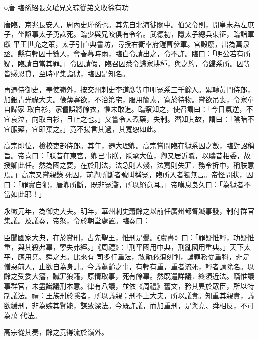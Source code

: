 
\begin{pinyinscope}

 ○唐
 臨孫紹張文瓘兄文琮從弟文收徐有功



 唐臨，京兆長安人，周內史瑾孫也。其先自北海徙關中。伯父令則，開皇末為左庶子，坐諂事太子勇誅死。臨少與兄皎俱有令名。武德初，隱太子總兵東征，臨詣軍獻
 平王世充之策，太子引直典書坊，尋授右衛率府鎧曹參軍。宮殿廢，出為萬泉丞。縣有輕囚十數人，會春暮時雨，臨白令請出之，令不許。臨曰：「明公若有所疑，臨請自當其罪。」令因請假，臨召囚悉令歸家耕種，與之約，令歸系所。囚等皆感恩貸，至時畢集詣獄，臨因是知名。



 再遷侍御史，奉使嶺外，按交州刺史李道彥等申叩冤系三千餘人。累轉黃門侍郎，加銀青光祿大夫。儉薄寡欲，不治第宅，服用簡素，寬於待物。嘗欲吊喪，令家童自歸家
 取白衫，家僮誤將餘衣，懼未敢進。臨察知之，使召謂曰：「今日氣逆，不宜哀泣，向取白衫，且止之也。」又嘗令人煮藥，失制。潛知其故，謂曰：「陰暗不宜服藥，宜即棄之。」竟不揚言其過，其寬恕如此。



 高宗即位，檢校吏部侍郎。其年，遷大理卿。高宗嘗問臨在獄系囚之數，臨對詔稱旨。帝喜曰：「朕昔在東宮，卿已事朕，朕承大位，卿又居近職，以疇昔相委，故授卿此任。然為國之要，在於刑法，法急則人殘，法寬則失罪，務令折中，稱朕意焉。」高宗又嘗親錄
 死囚，前卿所斷者號叫稱冤，臨所入者獨無言。帝怪問狀，囚曰：「罪實自犯，唐卿所斷，既非冤濫，所以絕意耳。」帝嘆息良久曰：「為獄者不當如此耶！」



 永徽元年，為御史大夫。明年，華州刺史蕭齡之以前任廣州都督贓事發，制付群官集議。及議奏，帝怒，令於朝堂處置。臨奏曰：



 臣聞國家大典，在於賞刑，古先聖王，惟刑是釁。《虞書》曰：「罪疑惟輕，功疑惟重，與其殺弗辜，寧失弗經。」《周禮》：「刑平國用中典，刑亂國用重典。」天下太平，應用堯、舜之典。比來有
 司多行重法，敘勛必須刻削，論罪務從重科，非是憎惡前人，止欲自為身計。今議蕭齡之事，有輕有重，重者流死，輕者請除名。以齡之受委大籓，贓罪狼籍，原情取事，死有餘辜。然既遣詳議，終須近法。竊惟議事群官，未盡識議刑本意。律有八議，並依《周禮》舊文，矜其異於眾臣，所以特制議法。禮：王族刑於隱者，所以議親；刑不上大夫，所以議貴。知重其親貴，議欲緩刑，非為嫉其賢能，謀致深法。今既許議，而加重刑，是與堯、舜相反，不可為萬
 代法。



 高宗從其奏，齡之竟得流於嶺外。




\end{pinyinscope}
